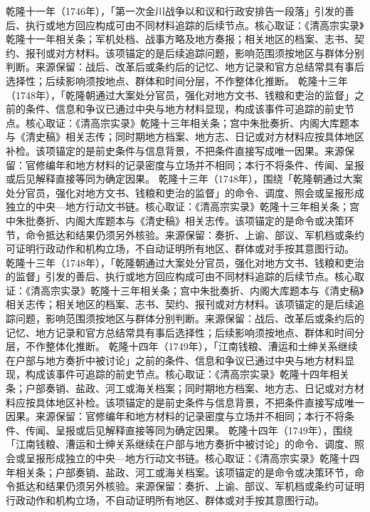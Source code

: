乾隆十一年（1746年），「第一次金川战争以和议和行政安排告一段落」引发的善后、执行或地方回应构成可由不同材料追踪的后续节点。核心取证：《清高宗实录》乾隆十一年相关条；军机处档、战事方略及地方奏报；相关地区的档案、志书、契约、报刊或对方材料。该项锚定的是后续追踪问题，影响范围须按地区与群体分别判断。来源保留：战后、改革后或条约后的记忆、地方记录和官方总结常具有事后选择性；后续影响须按地点、群体和时间分层，不作整体化推断。
乾隆十三年（1748年），「乾隆朝通过大案处分官员，强化对地方文书、钱粮和吏治的监督」之前的条件、信息和争议已通过中央与地方材料显现，构成该事件可追踪的前史节点。核心取证：《清高宗实录》乾隆十三年相关条；宫中朱批奏折、内阁大库题本与《清史稿》相关志传；同时期地方档案、地方志、日记或对方材料应按具体地区补检。该项锚定的是前史条件与信息背景，不把条件直接写成唯一因果。来源保留：官修编年和地方材料的记录密度与立场并不相同；本行不将条件、传闻、呈报或后见解释直接等同为确定因果。
乾隆十三年（1748年），围绕「乾隆朝通过大案处分官员，强化对地方文书、钱粮和吏治的监督」的命令、调度、照会或呈报形成独立的中央—地方行动文书链。核心取证：《清高宗实录》乾隆十三年相关条；宫中朱批奏折、内阁大库题本与《清史稿》相关志传。该项锚定的是命令或决策环节，命令抵达和结果仍须另外核验。来源保留：奏折、上谕、部议、军机档或条约可证明行政动作和机构立场，不自动证明所有地区、群体或对手按其意图行动。
乾隆十三年（1748年），「乾隆朝通过大案处分官员，强化对地方文书、钱粮和吏治的监督」引发的善后、执行或地方回应构成可由不同材料追踪的后续节点。核心取证：《清高宗实录》乾隆十三年相关条；宫中朱批奏折、内阁大库题本与《清史稿》相关志传；相关地区的档案、志书、契约、报刊或对方材料。该项锚定的是后续追踪问题，影响范围须按地区与群体分别判断。来源保留：战后、改革后或条约后的记忆、地方记录和官方总结常具有事后选择性；后续影响须按地点、群体和时间分层，不作整体化推断。
乾隆十四年（1749年），「江南钱粮、漕运和士绅关系继续在户部与地方奏折中被讨论」之前的条件、信息和争议已通过中央与地方材料显现，构成该事件可追踪的前史节点。核心取证：《清高宗实录》乾隆十四年相关条；户部奏销、盐政、河工或海关档案；同时期地方档案、地方志、日记或对方材料应按具体地区补检。该项锚定的是前史条件与信息背景，不把条件直接写成唯一因果。来源保留：官修编年和地方材料的记录密度与立场并不相同；本行不将条件、传闻、呈报或后见解释直接等同为确定因果。
乾隆十四年（1749年），围绕「江南钱粮、漕运和士绅关系继续在户部与地方奏折中被讨论」的命令、调度、照会或呈报形成独立的中央—地方行动文书链。核心取证：《清高宗实录》乾隆十四年相关条；户部奏销、盐政、河工或海关档案。该项锚定的是命令或决策环节，命令抵达和结果仍须另外核验。来源保留：奏折、上谕、部议、军机档或条约可证明行政动作和机构立场，不自动证明所有地区、群体或对手按其意图行动。
